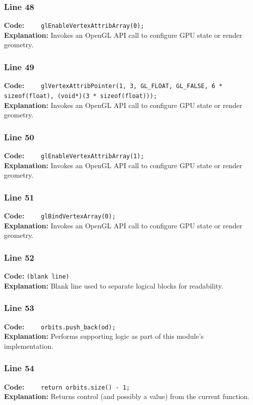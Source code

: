 \documentclass[11pt,a4paper]{article}
\begin{document}
\subsubsection*{Line 48}
\textbf{Code:} \verb|    glEnableVertexAttribArray(0);|\\
\textbf{Explanation:} Invokes an OpenGL API call to configure GPU state or render geometry.

\subsubsection*{Line 49}
\textbf{Code:} \verb|    glVertexAttribPointer(1, 3, GL_FLOAT, GL_FALSE, 6 * sizeof(float), (void*)(3 * sizeof(float)));|\\
\textbf{Explanation:} Invokes an OpenGL API call to configure GPU state or render geometry.

\subsubsection*{Line 50}
\textbf{Code:} \verb|    glEnableVertexAttribArray(1);|\\
\textbf{Explanation:} Invokes an OpenGL API call to configure GPU state or render geometry.

\subsubsection*{Line 51}
\textbf{Code:} \verb|    glBindVertexArray(0);|\\
\textbf{Explanation:} Invokes an OpenGL API call to configure GPU state or render geometry.

\subsubsection*{Line 52}
\textbf{Code:} \texttt{(blank line)}\\
\textbf{Explanation:} Blank line used to separate logical blocks for readability.

\subsubsection*{Line 53}
\textbf{Code:} \verb|    orbits.push_back(od);|\\
\textbf{Explanation:} Performs supporting logic as part of this module's implementation.

\subsubsection*{Line 54}
\textbf{Code:} \verb|    return orbits.size() - 1;|\\
\textbf{Explanation:} Returns control (and possibly a value) from the current function.
\end{document}
